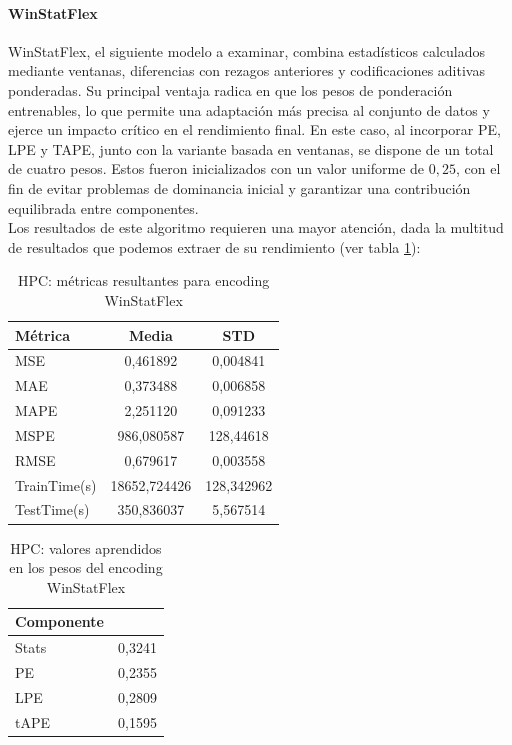 \paragraph{WinStatFlex}

WinStatFlex, el siguiente modelo a examinar, combina estadísticos calculados mediante ventanas, diferencias con rezagos anteriores y codificaciones aditivas ponderadas. Su principal ventaja radica en que los pesos de ponderación entrenables, lo que permite una adaptación más precisa al conjunto de datos y ejerce un impacto crítico en el rendimiento final. En este caso, al incorporar PE, LPE y TAPE, junto con la variante basada en ventanas, se dispone de un total de cuatro pesos. Estos fueron inicializados con un valor uniforme de $0,25$, con el fin de evitar problemas de dominancia inicial y garantizar una contribución equilibrada entre componentes.\\

Los resultados de este algoritmo requieren una mayor atención, dada la multitud de resultados que podemos extraer de su rendimiento (ver tabla \ref{hpcflex}):

\begin{table}[!ht]
	\centering
	\begin{tabular}{l|c|c}
		\toprule
		Métrica & Media & STD \\
		\midrule
		MSE & 0,461892 & 0,004841 \\
		MAE & 0,373488 & 0,006858 \\
		MAPE & 2,251120 & 0,091233 \\
		MSPE & 986,080587 & 128,44618 \\
		RMSE & 0,679617 & 0,003558 \\
		TrainTime(s) & 18652,724426 & 128,342962 \\
		TestTime(s) & 350,836037 & 5,567514 \\
		\bottomrule
	\end{tabular}
	\caption{HPC: métricas resultantes para encoding WinStatFlex}
	\label{hpcflex}
\end{table}

\begin{table}[!ht]
	\centering
		\begin{tabular}{l|N}
		\toprule
		Componente &  \\
		\midrule
		Stats & 0,3241 \\
		PE & 0,2355 \\
		LPE & 0,2809 \\
		tAPE & 0,1595 \\
		\bottomrule
	\end{tabular}
	\caption{HPC: valores aprendidos en los pesos del encoding WinStatFlex}
	\label{hpcflexpesos}
\end{table}

